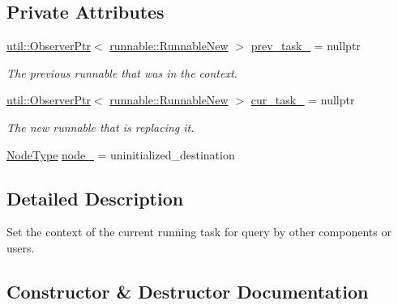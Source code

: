 \subsection*{Private Attributes}
\begin{DoxyCompactItemize}
\item 
\hyperlink{namespacevt_1_1util_a7d480434049896696b9a50c38a766202}{util\+::\+Observer\+Ptr}$<$ \hyperlink{structvt_1_1runnable_1_1_runnable_new}{runnable\+::\+Runnable\+New} $>$ \hyperlink{structvt_1_1ctx_1_1_set_context_af5a9e9f7f2f7deeadd17da554e8aa39b}{prev\+\_\+task\+\_\+} = nullptr
\begin{DoxyCompactList}\small\item\em The previous runnable that was in the context. \end{DoxyCompactList}\item 
\hyperlink{namespacevt_1_1util_a7d480434049896696b9a50c38a766202}{util\+::\+Observer\+Ptr}$<$ \hyperlink{structvt_1_1runnable_1_1_runnable_new}{runnable\+::\+Runnable\+New} $>$ \hyperlink{structvt_1_1ctx_1_1_set_context_a54caa513b9c676ccbd100f701f10ba81}{cur\+\_\+task\+\_\+} = nullptr
\begin{DoxyCompactList}\small\item\em The new runnable that is replacing it. \end{DoxyCompactList}\item 
\hyperlink{namespacevt_a866da9d0efc19c0a1ce79e9e492f47e2}{Node\+Type} \hyperlink{structvt_1_1ctx_1_1_set_context_a2dbb72742d51cb57da427ab187edde74}{node\+\_\+} = uninitialized\+\_\+destination
\end{DoxyCompactItemize}


\subsection{Detailed Description}
Set the context of the current running task for query by other components or users. 

\subsection{Constructor \& Destructor Documentation}
\mbox{\label{structvt_1_1ctx_1_1_set_context_afe7801893d4377046b6fc91c003bd883}} 
